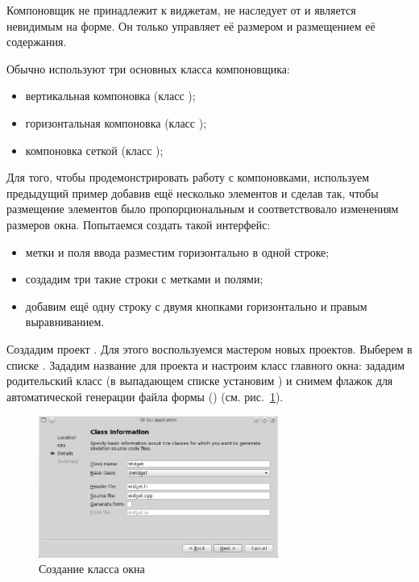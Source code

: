 Компоновщик не принадлежит к виджетам, не наследует от  и является невидимым на форме. Он только управляет её
размером и размещением её содержания.

Обычно используют три основных класса компоновщика:

\begin{itemize}
\item вертикальная компоновка (класс );
\item горизонтальная компоновка (класс );
\item компоновка сеткой (класс );
\end{itemize}
Для того, чтобы продемонстрировать работу с компоновками, используем предыдущий пример добавив ещё несколько элементов и
сделав так, чтобы размещение элементов было пропорциональным и соответствовало изменениям размеров окна. Попытаемся
создать такой интерфейс:

\begin{itemize}
\item метки и поля ввода разместим горизонтально в одной строке;
\item создадим три такие строки с метками и полями;
\item добавим ещё одну строку с двумя кнопками горизонтально и правым выравниванием.
\end{itemize}

Создадим проект . Для этого воспользуемся
мастером новых проектов. Выберем в списке . Зададим название для
проекта и настроим класс главного окна: зададим родительский класс (в выпадающем списке  установим
) и снимем флажок для автоматической генерации файла формы () 
(см. рис.~\ref{ch13:refDrawing3}).

\begin{figure}[htb]
\begin{center}
\includegraphics[width=0.7\textwidth]{img/ris_13_4}
\caption[Создание класса окна]{Создание класса окна}
\label{ch13:refDrawing3}
\end{center}
\end{figure}

